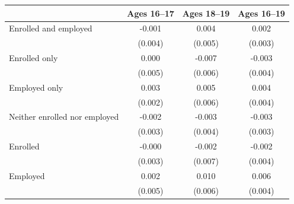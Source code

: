 \begin{tabular}{lccc}
\toprule
 & Ages 16--17 & Ages 18--19 & Ages 16--19 \\
\midrule
Enrolled and employed & -0.001 & 0.004 & 0.002 \\
 & (0.004) & (0.005) & (0.003) \\
Enrolled only & 0.000 & -0.007 & -0.003 \\
 & (0.005) & (0.006) & (0.004) \\
Employed only & 0.003 & 0.005 & 0.004 \\
 & (0.002) & (0.006) & (0.004) \\
Neither enrolled nor employed & -0.002 & -0.003 & -0.003 \\
 & (0.003) & (0.004) & (0.003) \\
Enrolled & -0.000 & -0.002 & -0.002 \\
 & (0.003) & (0.007) & (0.004) \\
Employed & 0.002 & 0.010 & 0.006 \\
 & (0.005) & (0.006) & (0.004) \\
\bottomrule
\end{tabular}
